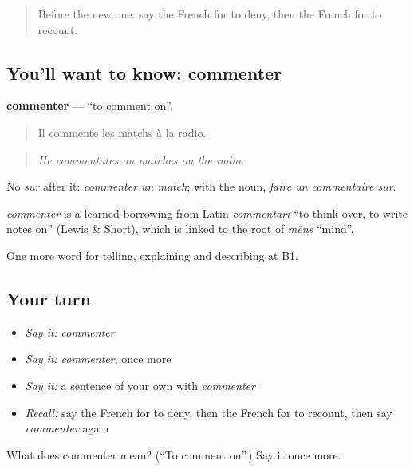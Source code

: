 \label{lesson:FR-C284-commenter}



\begin{quote}
Before the new one: say the French for to deny, then the French for to recount.
\end{quote}

\subsection*{You'll want to know: commenter}
\textbf{commenter} — \textquotedblleft{}to comment on\textquotedblright{}.

\begin{quote}
Il commente les matchs à la radio.
\end{quote}

\begin{quote}
\emph{He commentates on matches on the radio.}
\end{quote}

No \emph{sur} after it: \emph{commenter un match}; with the noun, \emph{faire un commentaire sur}.

\begin{cousinweb}
\emph{commenter} is a learned borrowing from Latin \emph{commentārī} \textquotedblleft{}to think over, to write notes on\textquotedblright{} (Lewis \& Short), which is linked to the root of \emph{mēns} \textquotedblleft{}mind\textquotedblright{}.
\end{cousinweb}

\begin{grammarlens}[title={What you've built}]
One more word for telling, explaining and describing at B1.
\end{grammarlens}

\subsection*{Your turn}
\begin{itemize}
\raggedright
  \item \emph{Say it:} \emph{commenter}
  \item \emph{Say it:} \emph{commenter}, once more
  \item \emph{Say it:} a sentence of your own with \emph{commenter}
  \item \emph{Recall:} say the French for to deny, then the French for to recount, then say \emph{commenter} again
\end{itemize}

\begin{tcolorbox}[breakable,colback=teal!4,colframe=teal!35!black,title={Before you move on}]
What does commenter mean? (\textquotedblleft{}To comment on\textquotedblright{}.) Say it once more.
\end{tcolorbox}
